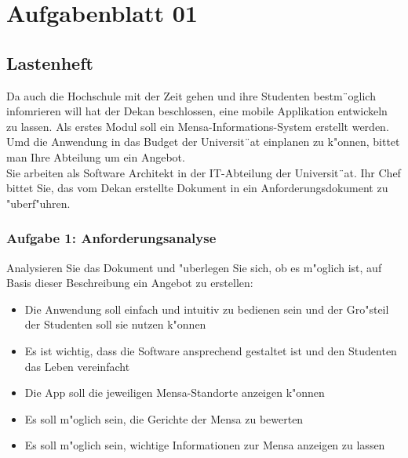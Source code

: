 

\chapter{Aufgabenblatt 01}
\section{Lastenheft}
Da auch die Hochschule mit der Zeit gehen und ihre Studenten bestm¨oglich infomrieren will hat der Dekan beschlossen, eine mobile Applikation entwickeln zu lassen.
Als erstes Modul soll ein Mensa-Informations-System erstellt werden.
Umd die Anwendung in das Budget der Universit¨at einplanen zu k"onnen, bittet man Ihre Abteilung um ein Angebot.\\

\noindent
Sie arbeiten als Software Architekt in der IT-Abteilung der Universit¨at.
Ihr Chef bittet Sie, das vom Dekan erstellte Dokument in ein Anforderungsdokument zu "uberf"uhren.

\subsection{Aufgabe 1: Anforderungsanalyse}
Analysieren Sie das Dokument und "uberlegen Sie sich, ob es m"oglich ist, auf Basis dieser Beschreibung ein Angebot zu erstellen:
\begin{itemize}
    \item Die Anwendung soll einfach und intuitiv zu bedienen sein und der Gro"steil der Studenten soll sie nutzen k"onnen
    \item Es ist wichtig, dass die Software ansprechend gestaltet ist und den Studenten das Leben vereinfacht
    \item Die App soll die jeweiligen Mensa-Standorte anzeigen k"onnen
    \item Es soll m"oglich sein, die Gerichte der Mensa zu bewerten
    \item Es soll m"oglich sein, wichtige Informationen zur Mensa anzeigen zu lassen
\end{itemize}





